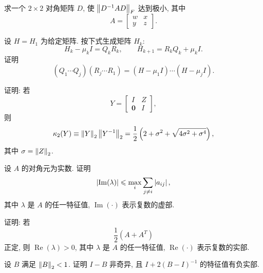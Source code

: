 \begin{exercises}
  \item 求一个 $2\times2$ 对角矩阵 $D$, 使 $\left\|D^{-1}AD\right\|_F$ 达到极小, 其中
    \[
      A=\begin{bmatrix}
        w & x\\
        y & z
      \end{bmatrix}.
    \]

  \item 设 $H=H_1$ 为给定矩阵. 按下式生成矩阵 $H_k$:
    \[
      H_k-\mu_kI=Q_kR_k,\qquad
      H_{k+1}=R_kQ_k+\mu_kI.
    \]
    证明
    \[
      (Q_1\cdots Q_j)(R_j\cdots R_1)=(H-\mu_1I)\cdots(H-\mu_jI).
    \]

  \item 证明: 若
    \[
      Y=\begin{bmatrix}
        I & Z\\
        \mathbf{0} & I
      \end{bmatrix},
    \]
    则
    \[
      \kappa_2(Y)\equiv\left\|Y\right\|_2\left\|Y^{-1}\right\|_2
      =\frac{1}{2}\left(2+\sigma^2+\sqrt{4\sigma^2+\sigma^4}\right),
    \]
    其中 $\sigma=\left\|Z\right\|_2$.

  \item 设 $A$ 的对角元为实数. 证明
    \[
      \left|\operatorname{Im}(\lambda)\right|
      \leqslant\max_i\sum_{j\neq i}\left|a_{ij}\right|,
    \]
    其中 $\lambda$ 是 $A$ 的任一特征值, $\operatorname{Im}(\cdot)$ 表示复数的虚部.

  \item 证明: 若
    \[
      \frac{1}{2}(A+A^T)
    \]
    正定, 则 $\operatorname{Re}(\lambda)>0$, 其中 $\lambda$ 是 $A$ 的任一特征值, $\operatorname{Re}(\cdot)$ 表示复数的实部.

  \item 设 $B$ 满足 $\left\|B\right\|_2<1$. 证明 $I-B$ 非奇异, 且 $I+2(B-I)^{-1}$ 的特征值有负实部.
\end{exercises}
